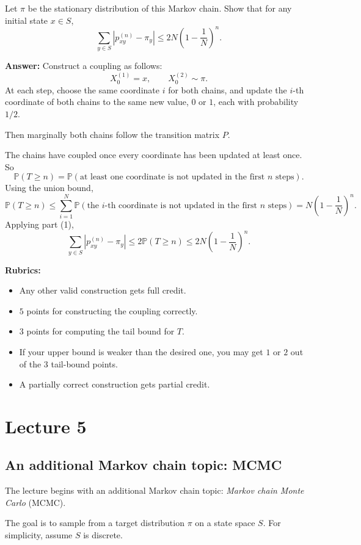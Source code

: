 \documentclass[11pt]{article}
\theoremstyle{definition}
\begin{document}
Let \(\pi\) be the stationary distribution of this Markov chain. Show that for any initial state \(x\in S\),
\[
\sum_{y\in S}|p_{xy}^{(n)}-\pi_y|
\le
2N\left(1-\frac{1}{N}\right)^n.
\]

\textbf{Answer:}
Construct a coupling as follows:
\[
X_0^{(1)}=x,
\qquad
X_0^{(2)}\sim \pi.
\]
At each step, choose the same coordinate \(i\) for both chains, and update the \(i\)-th coordinate of both chains to the same new value, \(0\) or \(1\), each with probability \(1/2\).

Then marginally both chains follow the transition matrix \(P\).

The chains have coupled once every coordinate has been updated at least once. So
\[
\mathbb P(T\ge n)
=
\mathbb P(\text{at least one coordinate is not updated in the first } n \text{ steps}).
\]
Using the union bound,
\[
\mathbb P(T\ge n)
\le
\sum_{i=1}^N
\mathbb P(\text{the } i\text{-th coordinate is not updated in the first } n \text{ steps})
=
N\left(1-\frac1N\right)^n.
\]
Applying part (1),
\[
\sum_{y\in S}|p_{xy}^{(n)}-\pi_y|
\le
2\mathbb P(T\ge n)
\le
2N\left(1-\frac1N\right)^n.
\]

\textbf{Rubrics:}
\begin{itemize}[leftmargin=2em]
    \item Any other valid construction gets full credit.
    \item \(5\) points for constructing the coupling correctly.
    \item \(3\) points for computing the tail bound for \(T\).
    \item If your upper bound is weaker than the desired one, you may get \(1\) or \(2\) out of the \(3\) tail-bound points.
    \item A partially correct construction gets partial credit.
\end{itemize}

\clearpage
\section{Lecture 5}

\subsection{An additional Markov chain topic: MCMC}

The lecture begins with an additional Markov chain topic: \emph{Markov chain Monte Carlo} (MCMC).

The goal is to sample from a target distribution \(\pi\) on a state space \(S\). For simplicity, assume \(S\) is discrete.
\end{document}
